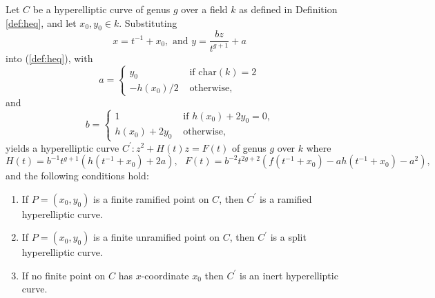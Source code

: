 \bt\label{thm:transform} \cite[Adapted from Theorem~12.4.12]{HandbookFF_2013}
Let $C$ be a hyperelliptic curve of genus $g$ over a field $k$ as defined in
Definition \ref{def:heq}, and let $x_0,y_0 \in k$. Substituting  $$ x = t^{-1} +
x_0, \text{ and } y = \frac{bz}{t^{g+1}} + a $$ into (\ref{def:heq}), with 
\begin{equation}
    a =
      \begin{cases}
        y_0 & \text{ if char}(k) = 2\\
        -h(x_0)/2 & \text{ otherwise,}
      \end{cases}       
  \end{equation}
and
\begin{equation}
    b =
      \begin{cases}
        1 & \text{ if $h(x_0) + 2y_0 = 0$,}\\
        h(x_0) + 2y_0 & \text{ otherwise,}
      \end{cases}       
  \end{equation}
yields a hyperelliptic curve $C^{\prime} : z^2 + H(t)z = F(t)$ of genus $g$ over
$k$ where $$H(t) = b^{-1}t^{g + 1}(h(t^{-1} + x_0) + 2a), \mbox{ } F(t) =
b^{-2}t^{2g + 2} (f(t^{-1} + x_0) - ah(t^{-1} + x_0) - a^2),$$
and the following conditions hold:
\begin{enumerate}
    \item If $P = (x_0,y_0)$ is a finite ramified point on $C$, then
    $C^{\prime}$ is a ramified hyperelliptic curve.
    \item If $P = (x_0,y_0)$ is a finite unramified point on $C$, then
    $C^{\prime}$ is a split hyperelliptic curve.
    \item If no finite point on $C$ has $x$-coordinate $x_0$ then
    $C^{\prime}$ is an inert hyperelliptic curve.
\end{enumerate}
\et

